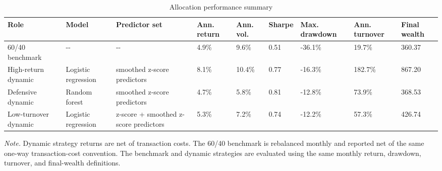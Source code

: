 ﻿\begin{table}[!htbp]
\centering
\caption{Allocation performance summary}
\label{tab:allocation-performance-summary}
\small
\setlength{\tabcolsep}{5pt}
\renewcommand{\arraystretch}{1.18}
\begin{adjustbox}{max width=\linewidth}
\begin{tabular}{lllllllll}
\toprule
Role & Model & Predictor set & Ann. return & Ann. vol. & Sharpe & Max. drawdown & Ann. turnover & Final wealth \\
\midrule
60/40 benchmark & \mbox{-{}-} & \mbox{-{}-} & 4.9\% & 9.6\% & 0.51 & -36.1\% & 19.7\% & 360.37 \\
High-return dynamic & Logistic regression & smoothed z-score predictors & 8.1\% & 10.4\% & 0.77 & -16.3\% & 182.7\% & 867.20 \\
Defensive dynamic & Random forest & smoothed z-score predictors & 4.7\% & 5.8\% & 0.81 & -12.8\% & 73.9\% & 368.53 \\
Low-turnover dynamic & Logistic regression & z-score + smoothed z-score predictors & 5.3\% & 7.2\% & 0.74 & -12.2\% & 57.3\% & 426.74 \\
\bottomrule
\end{tabular}
\end{adjustbox}
\vspace{0.65em}
\begin{minipage}{0.94\linewidth}
\footnotesize
\emph{Note.} Dynamic strategy returns are net of transaction costs. The 60/40 benchmark is rebalanced monthly and reported net of the same one-way transaction-cost convention. The benchmark and dynamic strategies are evaluated using the same monthly return, drawdown, turnover, and final-wealth definitions.
\end{minipage}
\end{table}

